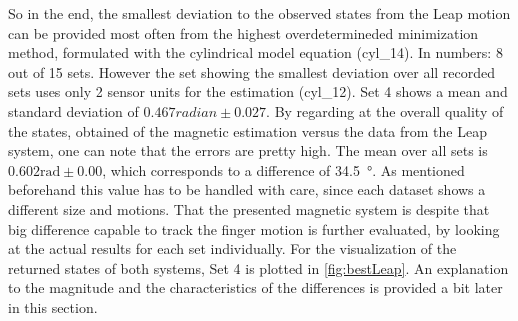 So in the end, the smallest deviation to the observed states from the Leap motion can be provided most often from the highest overdetermineded minimization method, formulated with the cylindrical model equation (cyl\_14). In numbers: 8 out of 15 sets. 
However the set showing the smallest deviation over all recorded sets uses only 2 sensor units for the estimation (cyl\_12). Set 4 shows a mean and standard deviation of $ 0.467 \si{radian} \pm 0.027 $. By regarding at the overall quality of the states, obtained of the magnetic estimation versus the data from the Leap system, one can note that the errors are pretty high. The mean over all sets is $ 0.602 \si{\radian} \pm 0.00 $, which corresponds to a difference of \SI{34.5}{\degree}. As mentioned beforehand this value has to be handled with care, since each dataset shows a different size and motions. That the presented magnetic system is despite that big difference capable to track the finger motion is further evaluated, by looking at the actual results for each set individually. For the visualization of the returned states of both systems, Set 4 is plotted in \ref{fig:bestLeap}. An explanation to the magnitude and the characteristics of the differences is provided a bit later in this section. 

